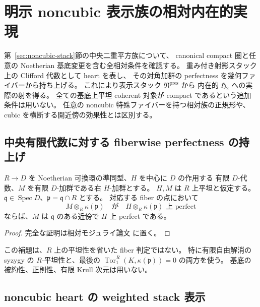 \section{明示 noncubic 表示族の相対内在的実現}
\label{sec:relative-noncubic-families}

第~\ref{sec:noncubic-stack}節の中央二重平方族について、
canonical compact 圏と任意の Noetherian 基底変更を含む全相対条件を確認する。
重み付き射影スタック上の Clifford 代数として heart を表し、
その対角加群の perfectness を幾何ファイバーから持ち上げる。
これにより表示スタック $\mathfrak N^{\mathrm{pres}}$ から
内在的 $\mathfrak H_2$ への実際の射を得る。
全ての基底上平坦 coherent 対象が compact であるという追加条件は用いない。
任意の noncubic 特殊ファイバーを持つ相対族の正規形や、
cubic を横断する開近傍の効果性とは区別する。

\subsection{中央有限代数に対する fiberwise perfectness の持上げ}

\begin{lemma}\label{lem:nc-fiber-perfect}
$R\to D$ を Noetherian 可換環の準同型、$H$ を中心に $D$ の作用する
有限 $D$-代数、$M$ を有限 $D$-加群である右 $H$-加群とする。
$H,M$ は $R$ 上平坦と仮定する。
$\mathfrak q\in\operatorname{Spec} D$、$\mathfrak p=\mathfrak q\cap R$ とする。
対応する fiber の点において
\[
 M\otimes_R\kappa(\mathfrak p)
 \quad\text{が}\quad
 H\otimes_R\kappa(\mathfrak p)\text{ 上 perfect}
\]
ならば、$M$ は $\mathfrak q$ のある近傍で $H$ 上 perfect である。
\end{lemma}

\begin{proof}
完全な証明は相対モジュライ論文 \cite[\texttt{relative_noncubic_families}]{QuadricModuli2026} に置く。
\end{proof}

\begin{remark}
この補題は、$R$ 上の平坦性を省いた fiber 判定ではない。
特に有限自由解消の syzygy の $R$-平坦性と、最後の
$\operatorname{Tor}_1^R(K,\kappa(\mathfrak p))=0$ の両方を使う。
基底の被約性、正則性、有限 Krull 次元は用いない。
\end{remark}

\subsection{noncubic heart の weighted stack 表示}

